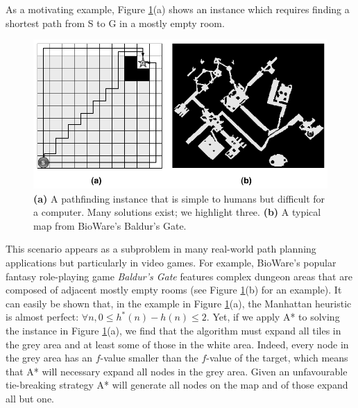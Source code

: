 As a motivating example, Figure \ref{fig-emptymap}(a) shows an instance
which requires finding a shortest path from S to G in a mostly empty room.
\begin{figure}[htbp]
       \begin{center}
         \includegraphics[scale=0.30, trim = 20mm 20mm 20mm 0mm]{diagrams/emptymap.png}
       \end{center}
	\vspace{-3pt}
       \caption{\textbf{(a)} A pathfinding instance that is simple to humans but difficult for a computer. Many solutions exist; we highlight three. 
\textbf{(b)} A typical map from BioWare's Baldur's Gate.}
       \label{fig-emptymap}
\end{figure}
This scenario appears as a subproblem in many real-world path planning applications but particularly
in video games.
For example, BioWare's popular fantasy role-playing game \emph{Baldur's Gate} features complex dungeon
 areas that are composed of adjacent mostly empty rooms (see Figure \ref{fig-emptymap}(b) for an example).
It can easily be shown that, in the example in Figure \ref{fig-emptymap}(a), the Manhattan heuristic is almost perfect: $\forall n, 0 \leq h^*(n) - h(n) \leq 2$.
Yet, if we apply A* \cite{hart68} to solving the instance in Figure \ref{fig-emptymap}(a), 
we find that the algorithm must expand all tiles in the grey 
area and at least some of those in the white area.
Indeed, every node in the grey area has an $f$-value smaller than the $f$-value of the target,
which means that A* will necessary expand all nodes in the grey area.
Given an unfavourable tie-breaking strategy A* will generate all nodes on the map and of those expand 
all but one.

